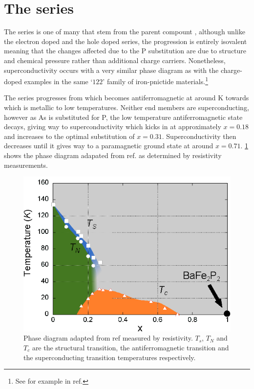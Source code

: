 
\section{The \BaFePAs series}

The \BaFePAs series is one of many that stem from the parent compount \BaFeAs, although unlike the electron doped \BaCoFeAs and the hole doped \BaKFeAs series, the \BaFePAs progression is entirely isovalent meaning that the changes affected due to the P substitution are due to structure and chemical pressure rather than additional charge carriers. Nonetheless, superconductivity occurs with a very similar phase diagram as with the charge-doped examples in the same `$122$' family of iron-pnictide materials.\footnote{See for example  in ref.\cite{Paglione2010}}

The \BaFePAs series progresses from \BaFeAs which becomes antiferromagnetic at around \unit[138]{K} towards \BaFeP which is metallic to low temperatures. Neither end members are superconducting, however as As is substituted for P, the low temperature antiferromagnetic state decays, giving way to superconductivity which kicks in at approximately $x=0.18$ and increases to the optimal substitution of $x=0.31$. Superconductivity then decreases until it gives way to a paramagnetic ground state at around $x=0.71$. \Fig\ref{Fig:3:PhaseDiagram} shows the phase diagram adapated from ref. \cite{Nakai2010a} as determined by resistivity measurements.

\begin{figure}
    \begin{center}
        \includegraphics[scale=1.0]{Chapter3-dHvABaFe2P2/Figures/BaFe2P2Series/PhaseDiagram/PhaseDiagram}
        \caption{Phase diagram adapted from ref \cite{Nakai2010a} measured by resistivity. $T_s$, $T_N$ and $T_c$ are the structural transition, the antiferromagnetic transition and the superconducting transition temperatures respectively.}
        \label{Fig:3:PhaseDiagram}
    \end{center}
\end{figure}

